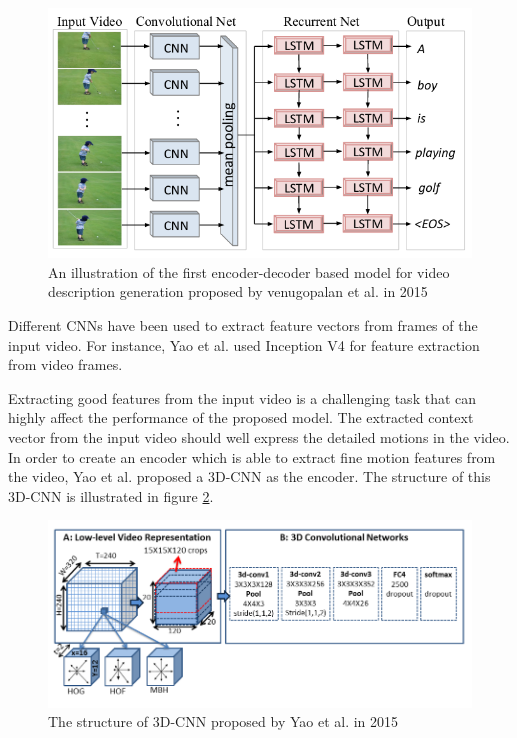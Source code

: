 \documentclass[preprint, 12pt]{elsarticle}
\begin{document}
		\begin{figure}[H]
			\centering
			\includegraphics[scale=0.5]{Imgs/vid1.png}
			\caption{An illustration of the first encoder-decoder based model for video description generation proposed by venugopalan et al. in 2015 \cite{venugopalan2014translating}}
			\label{fig:vid1}
		\end{figure}
	
		Different CNNs have been used to extract feature vectors from frames of the input video. For instance, Yao et al. \cite{yao2017boosting} used Inception V4 \cite{szegedy2017inception} for feature extraction from video frames.
	
		Extracting good features from the input video is a challenging task that can highly affect the performance of the proposed model. The extracted context vector from the input video should well express the detailed motions in the video. In order to create an encoder which is able to extract fine motion features from the video, Yao et al. \cite{yao2015describing} proposed a 3D-CNN as the encoder. The structure of this 3D-CNN is illustrated in figure \ref{fig:3dcnn}.
		
		\begin{figure}[H]
			\centering
			\includegraphics[scale=0.5]{Imgs/3DCNN.png}
			\caption{The structure of 3D-CNN proposed by Yao et al. in 2015 \cite{yao2015describing}}
			\label{fig:3dcnn}
		\end{figure}
	
\end{document}
